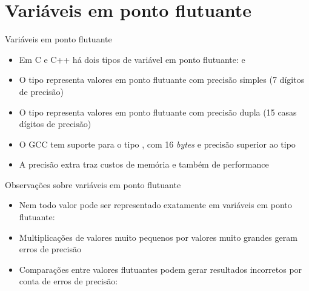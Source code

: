 \section{Variáveis em ponto flutuante}

\begin{frame}[fragile]{Variáveis em ponto flutuante}

    \begin{itemize}
        \item Em C e C++ há dois tipos de variável em ponto flutuante:  e

        \item O tipo  representa valores em ponto flutuante com precisão
            simples (7 dígitos de precisão)

        \item O tipo  representa valores em ponto flutuante com precisão
            dupla (15 casas dígitos de precisão)

        \item O GCC tem suporte para o tipo , com 16 \textit{bytes} e 
            precisão superior ao tipo 

        \item A precisão extra traz custos de memória e também de performance

    \end{itemize}

\end{frame}

\begin{frame}[fragile]{Observações sobre variáveis em ponto flutuante}

    \begin{itemize}
        \item Nem todo valor pode ser representado exatamente em variáveis em ponto
            flutuante:

        \item Multiplicações de valores muito pequenos por valores muito grandes geram erros
            de precisão

        \item Comparações entre valores flutuantes podem gerar resultados incorretos por conta
            de erros de precisão:

    \end{itemize}

\end{frame}

